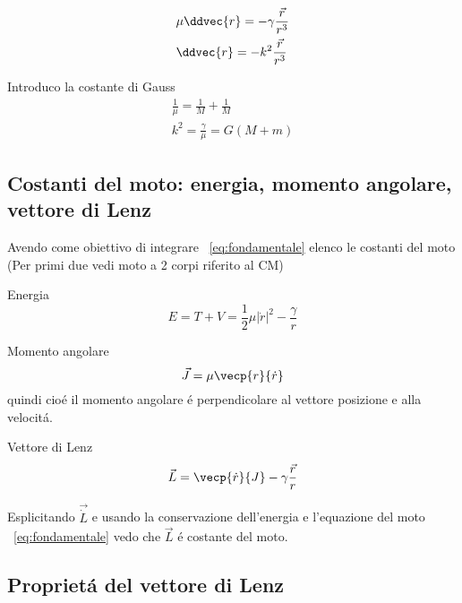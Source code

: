 \begin{align}
&\mu\ddvec{r}=-\gamma\frac{\vec{r}}{r^3}\label{eq:fondamentale}\\
&\ddvec{r}=-k^2\frac{\vec{r}}{r^3}
\end{align}

Introduco la costante di Gauss
\begin{align*}
\frac{1}{\mu}=\frac{1}{M}+\frac{1}{M}\\
k^2=\frac{\gamma}{\mu}=G(M+m)
\end{align*}

\subsection{Costanti del moto: energia, momento angolare, vettore di Lenz}
Avendo come obiettivo di integrare ~\ref{eq:fondamentale} elenco le costanti del moto (Per primi due vedi moto a 2 corpi riferito al CM)

\begin{enumerate*}

\item Energia\\
\begin{equation*}
E=T+V=\frac{1}{2}\mu|\dot{r}|^2-\frac{\gamma}{r}
\end{equation*}

\item Momento angolare\\
\begin{equation*}
\vec{J}=\mu\vecp{r}{\dot{r}}
\end{equation*}
quindi  cio\'e il momento angolare \'e perpendicolare al vettore posizione e alla velocit\'a.


\item Vettore di Lenz\\
\begin{equation*}\label{eq:lenzv}
\vec{L}=\vecp{\dot{r}}{J}-\gamma\frac{\vec{r}}{r}
\end{equation*}




\end{enumerate*}

Esplicitando $\vec{\dot{L}}$ e usando la conservazione dell'energia e l'equazione del moto ~\ref{eq:fondamentale} vedo che $\vec{L}$ \'e costante del moto.

\subsection{Propriet\'a del vettore di Lenz}

